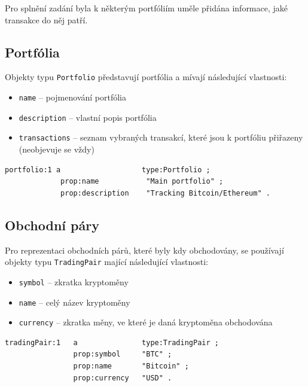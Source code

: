 \documentclass[12pt, a4paper]{article}
\begin{document}
Pro splnění zadání byla k některým portfóliím uměle přidána informace, jaké transakce do něj patří.

\subsection{Portfólia}
Objekty typu \texttt{Portfolio} představují portfólia a mívají následující vlastnosti:
\begin{itemize}
    \item \texttt{name} -- pojmenování portfólia
    \item \texttt{description} -- vlastní popis portfólia
    \item \texttt{transactions} -- seznam vybraných transakcí, které jsou k portfóliu přiřazeny (neobjevuje se vždy)
\end{itemize}

\begin{lstlisting}
portfolio:1 a                   type:Portfolio ;
             prop:name           "Main portfolio" ;
             prop:description    "Tracking Bitcoin/Ethereum" .
\end{lstlisting}

\subsection{Obchodní páry}
Pro reprezentaci obchodních párů, které byly kdy obchodovány, se používají objekty typu \texttt{TradingPair} mající následující vlastnosti:

\begin{itemize}
    \item \texttt{symbol} -- zkratka kryptoměny
    \item \texttt{name} -- celý název kryptoměny
    \item \texttt{currency} -- zkratka měny, ve které je daná kryptoměna obchodována
\end{itemize}

\begin{lstlisting}
tradingPair:1   a               type:TradingPair ;
                prop:symbol     "BTC" ;
                prop:name       "Bitcoin" ;
                prop:currency   "USD" .
\end{lstlisting}
\end{document}
